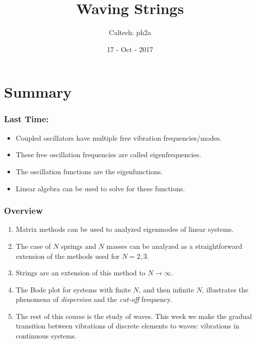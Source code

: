 \documentclass[pdf, handout, hideothersubsections]{beamer}
\begin{document}
\title{Waving Strings}  
\author{Caltech: ph2a}
\date{17 - Oct - 2017}


\frame{\titlepage} 



\section{Summary}
\begin{frame}
\frametitle{Last Time:}
\begin{itemize}
\item Coupled oscillators have multiple free vibration frequencies/modes.
\item These free oscillation frequencies are called eigenfrequencies.
\item The oscillation functions are the eigenfunctions.
\item Linear algebra can be used to solve for these functions.
\end{itemize}
\end{frame}


\begin{frame}
\frametitle{Overview}
\begin{enumerate}
  \pause
\item Matrix methods can be used to analyzed eigenmodes of linear systems.
  \pause
\item The case of $N$ springs and $N$ masses can be analyzed as a
  straightforward extension of the methods used for $N = 2, 3$.
  \pause
\item Strings are an extension of this method to $N \rightarrow \infty$.
  \pause
\item The Bode plot for systems with finite $N$, and then 
  infinite $N$, illustrates the phenomena of \emph{dispersion} and the
  \emph{cut-off} frequency.
\pause
\item The rest of this course is the study of waves. This week we make
  the gradual transition between vibrations of discrete elements to
  waves: vibrations in continuous systems.
\end{enumerate}
\end{frame}
\end{document}
